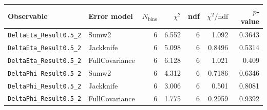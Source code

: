 \begin{tabular}{|l|l|r|r|r|r|r|}
\hline
Observable & Error model & $N_{\mathrm{bins}}$ & $\chi^2$ & ndf & $\chi^2/\mathrm{ndf}$ & $p$-value \\
\hline
\texttt{DeltaEta\_Result0.5\_2} & Sumw2 & 6 & 6.552 & 6 & 1.092 & 0.3643 \\
\texttt{DeltaEta\_Result0.5\_2} & Jackknife & 6 & 5.098 & 6 & 0.8496 & 0.5314 \\
\texttt{DeltaEta\_Result0.5\_2} & FullCovariance & 6 & 6.128 & 6 & 1.021 & 0.409 \\
\texttt{DeltaPhi\_Result0.5\_2} & Sumw2 & 6 & 4.312 & 6 & 0.7186 & 0.6346 \\
\texttt{DeltaPhi\_Result0.5\_2} & Jackknife & 6 & 3.006 & 6 & 0.501 & 0.8081 \\
\texttt{DeltaPhi\_Result0.5\_2} & FullCovariance & 6 & 1.775 & 6 & 0.2959 & 0.9392 \\
\hline
\end{tabular}
